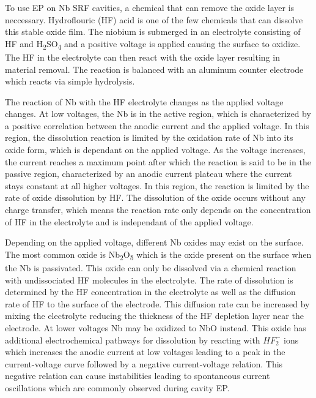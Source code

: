 To use EP on Nb SRF cavities, a chemical that can remove the oxide layer is neccessary. Hydroflouric (HF) acid is one of the few chemicals that can dissolve this stable oxide film. The niobium is submerged in an electrolyte consisting of HF and H\textsubscript{2}SO\textsubscript{4} and a positive voltage is applied causing the surface to oxidize. The HF in the electrolyte can then react with the oxide layer resulting in material removal. The reaction is balanced with an aluminum counter electrode which reacts via simple hydrolysis. 

The reaction of Nb with the HF electrolyte changes as the applied voltage changes. At low voltages, the Nb is in the active region, which is characterized by a positive correlation between the anodic current and the applied voltage. In this region, the dissolution reaction is limited by the oxidation rate of Nb into its oxide form, which is dependant on the applied voltage. As the voltage increases, the current reaches a maximum point after which the reaction is said to be in the passive region, characterized by an anodic current plateau where the current stays constant at all higher voltages. In this region, the reaction is limited by the rate of oxide dissolution by HF. The dissolution of the oxide occurs without any charge transfer, which means the reaction rate only depends on the concentration of HF in the electrolyte and is independant of the applied voltage\cite{ranjith2018anodic}.

Depending on the applied voltage, different Nb oxides may exist on the surface. The most common oxide is Nb\textsubscript{2}O\textsubscript{5} which is the oxide present on the surface when the Nb is passivated. This oxide can only be dissolved via a chemical reaction with undissociated HF molecules in the electrolyte. The rate of dissolution is determined by the HF concentration in the electrolyte as well as the diffusion rate of HF to the surface of the electrode. This diffusion rate can be increased by mixing the electrolyte reducing the thickness of the HF depletion layer near the electrode\cite{tian2010evaluation}. At lower voltages Nb may be oxidized to NbO instead. This oxide has additional electrochemical pathways for dissolution by reacting with $HF_2^-$ ions which increases the anodic current at low voltages leading to a peak in the current-voltage curve followed by a negative current-voltage relation\cite{ranjith2018anodic}. This negative relation can cause instabilities leading to spontaneous current oscillations which are commonly observed during cavity EP\cite{khun2013smoothening}.









